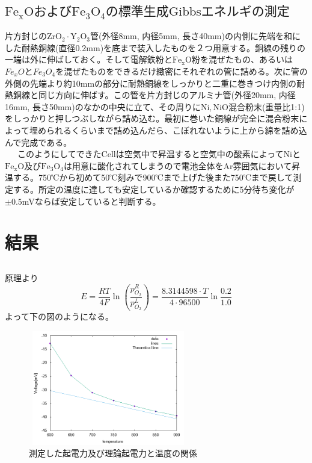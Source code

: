 \documentclass{jsarticle}
\begin{document}
\subsection{$\mathrm{Fe_xOおよびFe_3O_4の標準生成Gibbsエネルギの測定}$}
片方封じの$\mathrm{ZrO_2}\cdot\mathrm{Y_2O_3}$管(外径8mm, 内径5mm, 長さ40mm)の内側に先端を和にした耐熱銅線(直径0.2mm)を底まで装入したものを２つ用意する。銅線の残りの一端は外に伸ばしておく。そして電解鉄粉と$\mathrm{Fe_xO}$粉を混ぜたもの、あるいは$Fe_xOとFe_3O_4$を混ぜたものをできるだけ緻密にそれぞれの管に詰める。次に管の外側の先端より約10mmの部分に耐熱銅線をしっかりと二重に巻きつけ内側の耐熱銅線と同じ方向に伸ばす。この管を片方封じのアルミナ管(外径20mm, 内径16mm, 長さ50mm)のなかの中央に立て、その周りに$\mathrm{Ni, NiO}$混合粉末(重量比1:1)をしっかりと押しつぶしながら詰め込む。最初に巻いた銅線が完全に混合粉末によって埋められるくらいまで詰め込んだら、こぼれないように上から綿を詰め込んで完成である。\\
\ \ \ このようにしてできたCellは空気中で昇温すると空気中の酸素によってNiと$\mathrm{Fe_xO及びFe_3O_4}$は用意に酸化されてしまうので電池全体をAr雰囲気において昇温する。750℃から初めて50℃刻みで900℃まで上げた後また750℃まで戻して測定する。所定の温度に達しても安定しているか確認するために5分待ち変化が$\pm0.5$mVならば安定していると判断する。
\section{結果}
\subsection{}
原理より
$$
E=\frac{RT}{4F}\ln{(\frac{p_{O_2}^R}{p_{O_2}^L})}=\frac{8.3144598\cdot T}{4\cdot96500}\ln{\frac{0.2}{1.0}}
$$
よって下の図のようになる。
\begin{figure}[htbp]
 \begin{center}
  \includegraphics[width=70mm,height=50mm]{pictures/4-1.png}
 \end{center}
 \caption{測定した起電力及び理論起電力と温度の関係}
 \label{fig:one}
\end{figure}
\end{document}
